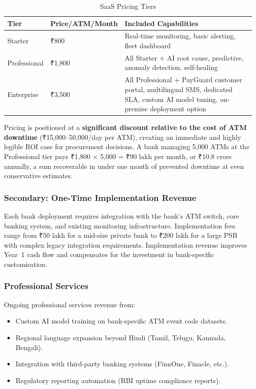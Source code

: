 \documentclass[12pt,a4paper]{article}
\newcommand{\inr}{₹}
\begin{document}
\begin{table}[H]
\centering
\caption{SaaS Pricing Tiers}
\small
\begin{tabular}{@{}L{3cm} C{3cm} L{7cm}@{}}
\toprule
\textbf{Tier} & \textbf{Price/ATM/Month} & \textbf{Included Capabilities} \\
\midrule
Starter       & \inr{}800    & Real-time monitoring, basic alerting, fleet dashboard \\
Professional  & \inr{}1,800  & All Starter + AI root cause, predictive, anomaly detection, self-healing \\
Enterprise    & \inr{}3,500  & All Professional + PayGuard customer portal, multilingual SMS,
                               dedicated SLA, custom AI model tuning, on-premise deployment option \\
\bottomrule
\end{tabular}
\end{table}

Pricing is positioned at a \textbf{significant discount relative to the cost of ATM downtime}
(\inr{}15,000--50,000/day per ATM), creating an immediate and highly legible ROI case for
procurement decisions. A bank managing 5,000 ATMs at the Professional tier pays
\inr{}1,800 $\times$ 5,000 = \inr{}90 lakh per month, or \inr{}10.8 crore annually, a sum
recoverable in under one month of prevented downtime at even conservative estimates.

\subsubsection{Secondary: One-Time Implementation Revenue}

Each bank deployment requires integration with the bank's ATM switch, core banking system,
and existing monitoring infrastructure. Implementation fees range from \inr{}50 lakh for
a mid-size private bank to \inr{}200 lakh for a large PSB with complex legacy integration
requirements. Implementation revenue improves Year~1 cash flow and compensates for the
investment in bank-specific customisation.

\subsubsection{Professional Services}

Ongoing professional services revenue from:
\begin{itemize}
  \item Custom AI model training on bank-specific ATM event code datasets.
  \item Regional language expansion beyond Hindi (Tamil, Telugu, Kannada, Bengali).
  \item Integration with third-party banking systems (FinnOne, Finacle, etc.).
  \item Regulatory reporting automation (RBI uptime compliance reports).
\end{itemize}
\end{document}
